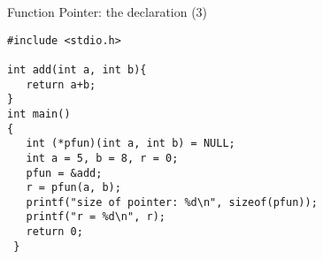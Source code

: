\begin{frame}[fragile]{Function Pointer: the declaration (3)}

\begin{lstlisting}[xleftmargin =0.05\linewidth, linewidth=0.86\linewidth]
#include <stdio.h>

int add(int a, int b){
   return a+b;
}
int main()
{
   int (*pfun)(int a, int b) = NULL;
   int a = 5, b = 8, r = 0;
   pfun = &add;
   r = pfun(a, b);
   printf("size of pointer: %d\n", sizeof(pfun));
   printf("r = %d\n", r);
   return 0;
 }
\end{lstlisting}
\end{frame}
